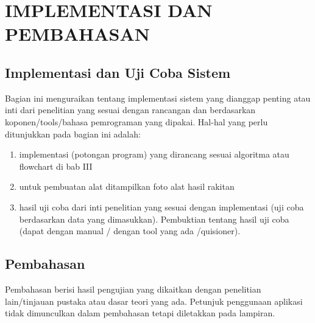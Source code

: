 
\chapter{IMPLEMENTASI DAN PEMBAHASAN}

	\section{Implementasi dan Uji Coba Sistem}
	Bagian ini menguraikan tentang implementasi sistem yang dianggap penting atau inti dari penelitian yang sesuai dengan rancangan dan berdasarkan koponen/tools/bahasa pemrograman yang dipakai. Hal-hal yang perlu ditunjukkan pada bagian ini adalah:
	\begin{enumerate}[noitemsep, label=\alph*.]
		\item  implementasi (potongan program) yang dirancang sesuai algoritma atau flowchart di bab III
		\item untuk pembuatan alat ditampilkan foto alat hasil rakitan
		\item hasil uji coba dari inti penelitian yang sesuai dengan implementasi (uji coba berdasarkan data yang dimasukkan). Pembuktian tentang hasil uji coba (dapat dengan manual / dengan tool yang ada /quisioner).
	\end{enumerate}

	
	\section{Pembahasan}		
		Pembahasan berisi hasil pengujian yang dikaitkan dengan penelitian lain/tinjauan pustaka atau dasar teori yang ada. Petunjuk penggunaan aplikasi tidak dimunculkan dalam pembahasan tetapi diletakkan pada lampiran.

